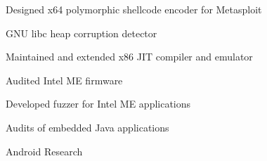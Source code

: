 \documentclass[]{SBResume}
\begin{document}
\begin{resume}
{      
      \begin{resumeitemize}
      \item{Designed x64 polymorphic shellcode encoder for Metasploit}
      \item{GNU libc heap corruption detector}
      \item{Maintained and extended x86 JIT compiler and emulator}
      \end{resumeitemize}
      \begin{resumeitemize}
      \item{Audited Intel ME firmware}
      \item{Developed fuzzer for Intel ME applications}
      \item{Audits of embedded Java applications}
      \item{Android Research}
      \end{resumeitemize}
      
    }
    
\end{resume}
\end{document}
